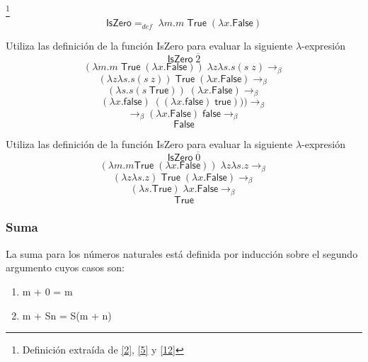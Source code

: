 	\begin{definition}\footnote{Definición extraída de \hyperlink{2}{[2]},  \hyperlink{5}{[5]} y \hyperlink{12}{[12]}}
            $$\textsf{IsZero} =_{def}  \; \lambda m. m\;\textsf{True} \;(\lambda x.\textsf{False})$$
        \end{definition}

        \begin{exercise}
            Utiliza las definición de la función \textsf{IsZero} para evaluar la siguiente $\lambda$-expresión
            \[
                \textsf{IsZero}  \; \overline{2}
            \]
            \[
                (\lambda m. m\;\textsf{True} \;(\lambda x.\textsf{False})) \; \lambda z\lambda s.s(s\;z) \rightarrow_\beta 
            \]
		\[
			(\lambda z\lambda s.s(s\:z)) \; \textsf{True} \; (\lambda x.\textsf{False})  \rightarrow_\beta 
		\]
            \[
                	(\lambda s.s(s\: \textsf{True})) \; (\lambda x.\textsf{False}) \rightarrow_\beta  
            \]
		\[
			(\lambda x.\textsf{false}) \; ((\lambda x.\textsf{false}) \; \textsf{true}))) \rightarrow_\beta  
		\]
            \[
                 \rightarrow_\beta  (\lambda x.\textsf{False}) \; \textsf{false} \rightarrow_\beta 
            \]
		\[
			\textsf{False}
		\]

        \end{exercise}

        \begin{exercise}
            Utiliza las definición de la función \textsf{IsZero} para evaluar la siguiente $\lambda$-expresión
            \[
                \textsf{IsZero} \; \overline{0}
            \]
            \[
                (\lambda m. m\textsf{True} \; (\lambda x.\textsf{False})) \; \lambda z\lambda s.z \rightarrow_\beta 
            \]
		\[
			(\lambda z\lambda s.z) \; \textsf{True} \; (\lambda x.\textsf{False}) \rightarrow_\beta 
		\]
            \[
                   (\lambda s.\textsf{True}) \; \lambda x.\textsf{False} \rightarrow_\beta 
            \]
		\[
			\textsf{True}
		\]
        \end{exercise}
        

    \subsubsection{Suma}
        La suma para los números naturales está definida por inducción sobre el segundo argumento cuyos casos son:
        \begin{enumerate}
            \item m + 0 = m 
            \item m + Sn = S(m + n)
        \end{enumerate}

